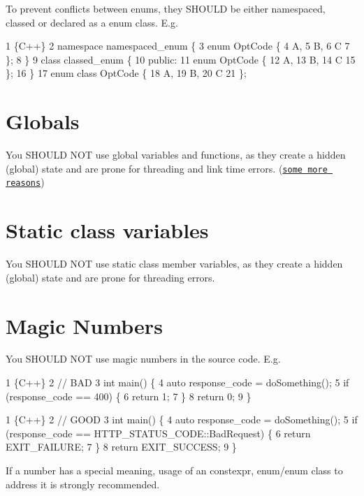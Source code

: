 To prevent conflicts between enums, they S\+H\+O\+U\+LD be either namespaced, classed or declared as a {\ttfamily enum class}. E.\+g. 
\begin{DoxyCode}
1 \{C++\}
2 namespace namespaced\_enum \{
3     enum OptCode \{
4         A,
5         B,
6         C
7     \};
8 \}
9 class classed\_enum \{
10     public:
11     enum OptCode \{
12         A,
13         B,
14         C
15     \};
16 \}
17 enum class OptCode \{
18     A,
19     B,
20     C
21 \};
\end{DoxyCode}


\section*{Globals}

You S\+H\+O\+U\+LD N\+OT use global variables and functions, as they create a hidden (global) state and are prone for threading and link time errors. (\href{http://wiki.c2.com/?GlobalVariablesAreBad}{\tt some more reasons})

\section*{Static class variables}

You S\+H\+O\+U\+LD N\+OT use {\ttfamily static} class member variables, as they create a hidden (global) state and are prone for threading errors.

\section*{Magic Numbers}

You S\+H\+O\+U\+LD N\+OT use magic numbers in the source code. E.\+g. 
\begin{DoxyCode}
1 \{C++\}
2 // BAD
3 int main() \{
4     auto response\_code = doSomething();
5     if (response\_code == 400) \{
6         return 1;
7     \}
8     return 0;
9 \}
\end{DoxyCode}
 
\begin{DoxyCode}
1 \{C++\}
2 // GOOD
3 int main() \{
4     auto response\_code = doSomething();
5     if (response\_code == HTTP\_STATUS\_CODE::BadRequest) \{
6         return EXIT\_FAILURE;
7     \}
8     return EXIT\_SUCCESS;
9 \}
\end{DoxyCode}


If a number has a special meaning, usage of an {\ttfamily constexpr}, {\ttfamily enum}/{\ttfamily enum class} to address it is strongly recommended.

